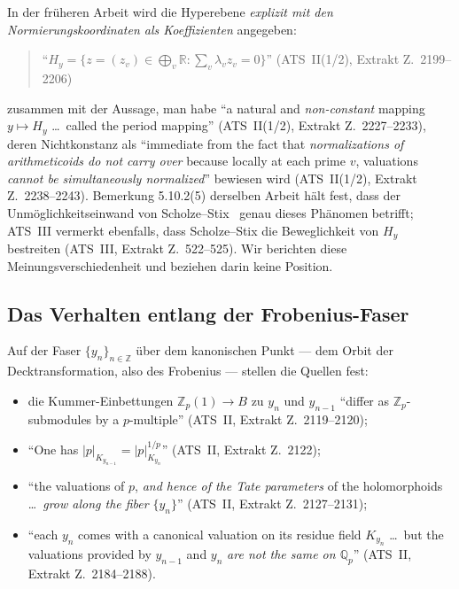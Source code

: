 \documentclass[11pt,a4paper]{article}
\theoremstyle{definition}
\theoremstyle{plain}
\theoremstyle{definition}
\newcommand{\anchor}[2]{(#1, Extrakt Z.~#2)}
\begin{document}
In der früheren Arbeit wird die Hyperebene \emph{explizit mit den
Normierungskoordinaten als Koeffizienten} angegeben:

\begin{quote}\small
``$H_y = \{ z = (z_v) \in \bigoplus_v \mathbb{R} : \sum_v \lambda_v z_v = 0 \}$''
\hfill\anchor{ATS~II(1/2)}{2199--2206}
\end{quote}

zusammen mit der Aussage, man habe ``a natural and \emph{non-constant} mapping
$y \mapsto H_y$ \ldots\ called the period mapping''
\anchor{ATS~II(1/2)}{2227--2233}, deren Nichtkonstanz als ``immediate from the fact
that \emph{normalizations of arithmeticoids do not carry over} because locally at
each prime $v$, valuations \emph{cannot be simultaneously normalized}'' bewiesen wird
\anchor{ATS~II(1/2)}{2238--2243}. Bemerkung 5.10.2(5) derselben Arbeit hält fest,
dass der Unmöglichkeitseinwand von Scholze--Stix~\cite{ScholzeStix2018} genau dieses
Phänomen betrifft; ATS~III vermerkt ebenfalls, dass Scholze--Stix die Beweglichkeit
von $H_y$ bestreiten \anchor{ATS~III}{522--525}. Wir berichten diese
Meinungsverschiedenheit und beziehen darin keine Position.

\subsection{Das Verhalten entlang der Frobenius-Faser}

Auf der Faser $\{y_n\}_{n \in \mathbb{Z}}$ über dem kanonischen Punkt --- dem Orbit
der Decktransformation, also des Frobenius --- stellen die Quellen fest:

\begin{itemize}
\item die Kummer-Einbettungen $\mathbb{Z}_p(1) \to B$ zu $y_n$ und $y_{n-1}$
  ``differ as $\mathbb{Z}_p$-submodules by a $p$-multiple''
  \anchor{ATS~II}{2119--2120};
\item ``One has $|p|_{K_{y_{n-1}}} = |p|^{1/p}_{K_{y_n}}$''
  \anchor{ATS~II}{2122};
\item ``the valuations of $p$, \emph{and hence of the Tate parameters} of the
  holomorphoids \ldots\ \emph{grow along the fiber} $\{y_n\}$''
  \anchor{ATS~II}{2127--2131};
\item ``each $y_n$ comes with a canonical valuation on its residue field
  $K_{y_n}$ \ldots\ but the valuations provided by $y_{n-1}$ and $y_n$ \emph{are
  not the same on $\mathbb{Q}_p$}'' \anchor{ATS~II}{2184--2188}.
\end{itemize}
\end{document}
